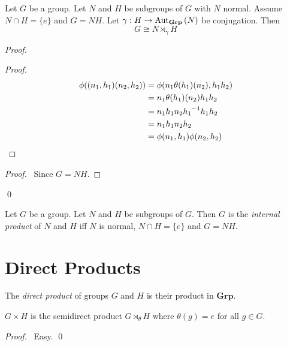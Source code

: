 \begin{prop}
\label{prop:internal-product}
Let $G$ be a group. Let $N$ and $H$ be subgroups of $G$ with $N$ normal. Assume $N \cap H = \{e\}$ and $G = NH$. Let $\gamma : H \rightarrow \mathrm{Aut}_{\mathbf{Grp}} \left( {N} \right)$ be conjugation. Then
\[ G \cong N \rtimes_\gamma H \]
\end{prop}

\begin{proof}
\pf
{}
\begin{proof}
	\pf
	\begin{align*}
		\phi((n_1,h_1)(n_2,h_2)) & = \phi(n_1 \theta(h_1)(n_2), h_1 h_2) \\
		& = n_1 \theta(h_1)(n_2) h_1 h_2 \\
		& = n_1 h_1 n_2 {h_1}^{-1} h_1 h_2 \\
		& = n_1 h_1 n_2 h_2 \\
		& = \phi(n_1,h_1) \phi(n_2,h_2)
	\end{align*}
\end{proof}
\begin{proof}
	\pf\ Since $G = NH$.
\end{proof}
\qed
\end{proof}

\begin{df}
Let $G$ be a group. Let $N$ and $H$ be subgroups of $G$. Then $G$ is the \emph{internal product} of $N$ and $H$ iff $N$ is normal, $N \cap H = \{e\}$ and $G = NH$.
\end{df}

\section{Direct Products}

\begin{df}
    The \emph{direct product} of groups $G$ and $H$ is their product in $\mathbf{Grp}$.
\end{df}

\begin{prop}
\label{prop:semidirect-direct}
$G \times H$ is the semidirect product $G \rtimes_\theta H$ where $\theta(g) = e$ for all $g \in G$.
\end{prop}

\begin{proof}
\pf\ Easy. \qed
\end{proof}

